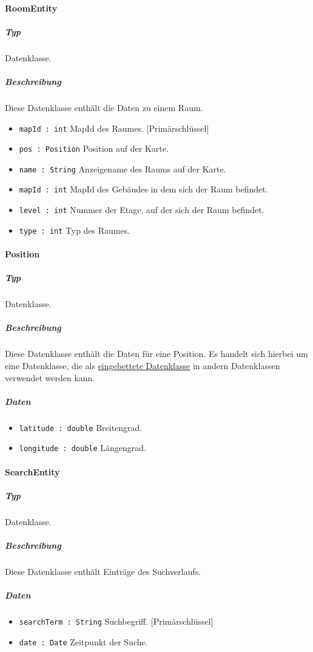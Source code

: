 \paragraph{RoomEntity}
\subparagraph*{Typ}
Datenklasse.
\subparagraph*{Beschreibung}
Diese Datenklasse enthält die Daten zu einem Raum.
\begin{itemize}
    \item \texttt{mapId : int} MapId des Raumes. [Primärschlüssel]
    \item \texttt{pos : Position} Position auf der Karte.
    \item \texttt{name : String} Anzeigename des Raums auf der Karte.
    \item \texttt{mapId : int} MapId des Gebäudes in dem sich der Raum befindet.
    \item \texttt{level : int} Nummer der Etage, auf der sich der Raum befindet.
    \item \texttt{type : int} Typ des Raumes.
\end{itemize}

\paragraph{Position}
\subparagraph*{Typ}
Datenklasse.
\subparagraph*{Beschreibung}
Diese Datenklasse enthält die Daten für eine Position.
Es handelt sich hierbei um eine Datenklasse, die als \href{https://developer.android.com/reference/android/arch/persistence/room/Embedded}
{eingebettete Datenklasse} in andern Datenklassen verwendet werden kann. 
\subparagraph*{Daten}
\begin{itemize}
    \item \texttt{latitude : double} Breitengrad.
    \item \texttt{longitude : double} Längengrad.
\end{itemize}

\paragraph{SearchEntity}
\subparagraph*{Typ}
Datenklasse.
\subparagraph*{Beschreibung}
Diese Datenklasse enthält Einträge des Suchverlaufs.
\subparagraph*{Daten}
\begin{itemize}
    \item \texttt{searchTerm : String} Suchbegriff. [Primärschlüssel]
    \item \texttt{date : Date} Zeitpunkt der Suche.
\end{itemize}

